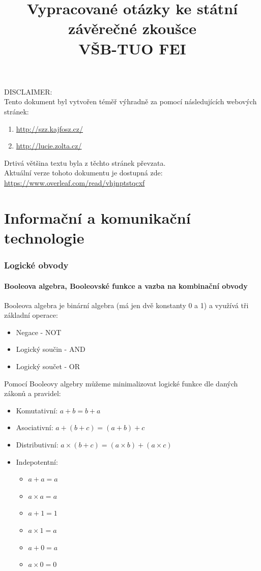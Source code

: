 \documentclass[10pt,a4paper]{article}
\author{}
\title{Vypracované otázky ke státní závěrečné zkoušce \\VŠB-TUO FEI}
\begin{document}
\maketitle
\begin{center}
\large{DISCLAIMER:}\\
Tento dokument byl vytvořen téměř výhradně za pomocí následujících webových stránek: 
\begin{enumerate}
\centering
\item \url{http://szz.kajfosz.cz/}
\item \url{http://lucie.zolta.cz/}
\end{enumerate}
Drtivá většina textu byla z těchto stránek převzata.\\
Aktuální verze tohoto dokumentu je dostupná zde:\\ \url{https://www.overleaf.com/read/vhjnptstqcxf}
\end{center}
\newpage
\tableofcontents
\newpage
\part{Informační a komunikační technologie}
\newpage
\section{Logické obvody}
\subsection{Booleova algebra, Booleovské funkce a vazba na kombinační obvody}
Booleova algebra je binární algebra (má jen dvě konstanty 0 a 1) a využívá tři základní operace:
\begin{itemize}
\item Negace - NOT
\item Logický součin - AND
\item Logický součet - OR
\end{itemize}
Pomocí Booleovy algebry můžeme minimalizovat logické funkce dle daných zákonů a pravidel:

\begin{itemize}
\item Komutativní: $a + b = b + a$
\item Asociativní: $a + (b + c) = (a + b) + c$
\item Distributivní: $a \times (b + c) = (a \times b) + (a \times c)$
\item Indepotentní:
\begin{itemize}
\item $a + a = a$
\item $a \times a = a$
\item $a + 1 = 1$
\item $a \times 1 = a$
\item $a + 0 = a$
\item $a \times 0 = 0$
\end{itemize}

\end{itemize}
\end{document}
